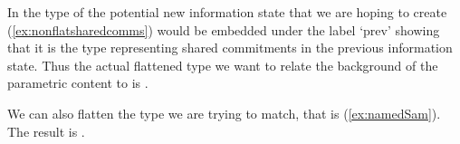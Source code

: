 In the type of the potential new information state that we are hoping
to create (\ref{ex:nonflatsharedcomms}) would be embedded under the
label `prev' showing that it is the type representing shared
commitments in the previous information state. Thus the actual
flattened type we want to relate the background of the parametric
content to is \nexteg{}.
\begin{ex} 
\label{ex:prevflatsharedcomms}
\end{ex} 

We can also flatten the type we are trying to match, that is
(\ref{ex:namedSam}).  The result is \nexteg{}.
\begin{ex} 
\end{ex} 

